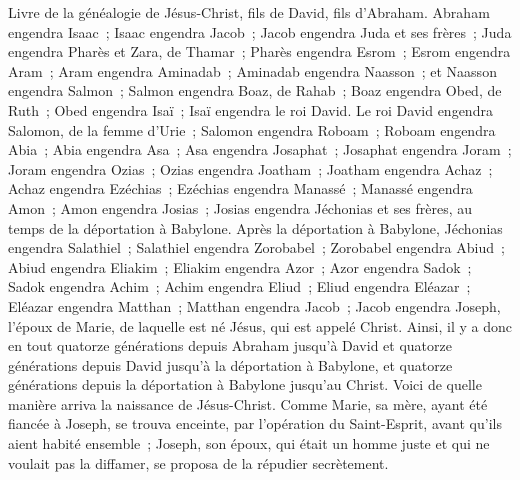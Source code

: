 \begin{multicols}{2}
\VerseOne{}Livre de la généalogie de Jésus-Christ, fils de David, fils d'Abraham.
Abraham engendra Isaac~; Isaac engendra Jacob~; Jacob engendra Juda et ses frères~;
Juda engendra Pharès et Zara, de Thamar~; Pharès engendra Esrom~; Esrom engendra Aram~;
Aram engendra Aminadab~; Aminadab engendra Naasson~; et Naasson engendra Salmon~;
Salmon engendra Boaz, de Rahab~; Boaz engendra Obed, de Ruth~; Obed engendra Isaï~;
Isaï engendra le roi David. Le roi David engendra Salomon, de la femme d'Urie~;
Salomon engendra Roboam~; Roboam engendra Abia~; Abia engendra Asa~;
Asa engendra Josaphat~; Josaphat engendra Joram~; Joram engendra Ozias~;
Ozias engendra Joatham~; Joatham engendra Achaz~; Achaz engendra Ezéchias~;
Ezéchias engendra Manassé~; Manassé engendra Amon~; Amon engendra Josias~;
Josias engendra Jéchonias et ses frères, au temps de la déportation à Babylone.
Après la déportation à Babylone, Jéchonias engendra Salathiel~; Salathiel engendra Zorobabel~;
Zorobabel engendra Abiud~; Abiud engendra Eliakim~; Eliakim engendra Azor~;
Azor engendra Sadok~; Sadok engendra Achim~; Achim engendra Eliud~;
Eliud engendra Eléazar~; Eléazar engendra Matthan~; Matthan engendra Jacob~;
Jacob engendra Joseph, l'époux de Marie, de laquelle est né Jésus, qui est appelé Christ.
Ainsi, il y a donc en tout quatorze générations depuis Abraham jusqu'à David et quatorze générations depuis David jusqu'à la déportation à Babylone, et quatorze générations depuis la déportation à Babylone jusqu'au Christ.
Voici de quelle manière arriva la naissance de Jésus-Christ. Comme Marie, sa mère, ayant été fiancée à Joseph, se trouva enceinte, par l'opération du Saint-Esprit, avant qu'ils aient habité ensemble~;
Joseph, son époux, qui était un homme juste et qui ne voulait pas la diffamer, se proposa de la répudier secrètement.

\end{multicols}
